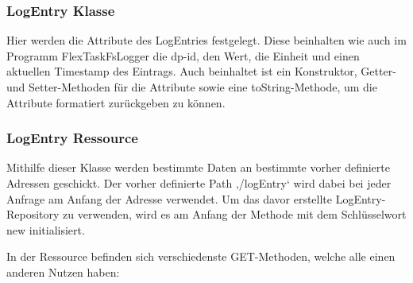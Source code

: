 \subsubsection{LogEntry Klasse}
Hier werden die Attribute des LogEntries festgelegt. Diese beinhalten wie auch im Programm FlexTaskFsLogger die dp-id, den Wert, die Einheit und einen aktuellen Timestamp des Eintrags.
Auch beinhaltet ist ein Konstruktor, Getter- und Setter-Methoden für die Attribute sowie eine toString-Methode, um die Attribute formatiert zurückgeben zu können.
 
\subsubsection{LogEntry Ressource}
Mithilfe dieser Klasse werden bestimmte Daten an bestimmte vorher definierte Adressen geschickt.
Der vorher definierte Path ‚/logEntry‘ wird dabei bei jeder Anfrage am Anfang der Adresse verwendet.
Um das davor erstellte LogEntry-Repository zu verwenden, wird es am Anfang der Methode mit dem Schlüsselwort new initialisiert.
 
In der Ressource befinden sich verschiedenste GET-Methoden, welche alle einen anderen Nutzen haben:
 
